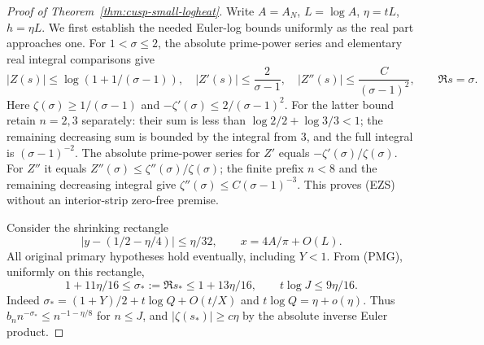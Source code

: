 \documentclass[11pt]{article}
\theoremstyle{remark}\newtheorem{remark}[theorem]{Remark}
\begin{document}
\begin{proof}[Proof of Theorem~\ref{thm:cusp-small-logheat}]
Write $A=A_N$, $L=\log A$, $\eta=tL$, $h=\eta L$.
We first establish the needed Euler-log bounds uniformly as the real
part approaches one. For $1<\sigma\le2$, the absolute prime-power
series and elementary real integral comparisons give
\[
 |Z(s)|\le\log(1+1/(\sigma-1)),\quad
 |Z'(s)|\le\frac2{\sigma-1},\quad
 |Z''(s)|\le\frac C{(\sigma-1)^2},\qquad \Re s=\sigma. \tag{EZS}
\]
Here $\zeta(\sigma)\ge1/(\sigma-1)$ and
$-\zeta'(\sigma)\le2/(\sigma-1)^2$.
For the latter bound retain $n=2,3$ separately: their sum is less
than $\log2/2+\log3/3<1$; the remaining decreasing sum is bounded
by the integral from $3$, and the full integral is $(\sigma-1)^{-2}$.
The absolute prime-power series for $Z'$ equals
$-\zeta'(\sigma)/\zeta(\sigma)$.
For $Z''$ it equals $Z''(\sigma)\le\zeta''(\sigma)/\zeta(\sigma)$;
the finite prefix $n<8$ and the remaining decreasing integral give
$\zeta''(\sigma)\le C(\sigma-1)^{-3}$.
This proves (EZS) without an interior-strip zero-free premise.

Consider the shrinking rectangle
\[
 |y-(1/2-\eta/4)|\le\eta/32,
 \qquad x=4A/\pi+O(L).                                \tag{SRH}
\]
All original primary hypotheses hold eventually, including $Y<1$.
From (PMG), uniformly on this rectangle,
\[
 1+11\eta/16\le\sigma_*:=\Re s_*\le1+13\eta/16,
 \qquad t\log J\le9\eta/16.                           \tag{SNE}
\]
Indeed $\sigma_*=(1+Y)/2+t\log Q+O(t/X)$ and
$t\log Q=\eta+o(\eta)$.
Thus $b_n n^{-\sigma_*}\le n^{-1-\eta/8}$ for $n\le J$,
and $|\zeta(s_*)|\ge c\eta$ by the absolute inverse Euler product.


\end{proof}
\end{document}
